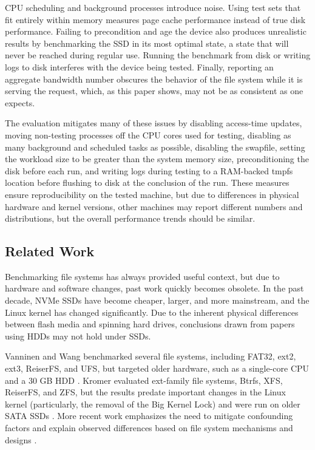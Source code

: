\documentclass[letterpaper,twocolumn,10pt]{article}
\begin{document}
CPU scheduling and background processes introduce noise. Using test sets that fit entirely within memory measures page cache performance instead of true disk performance. Failing to precondition and age the device also produces unrealistic results by benchmarking the SSD in its most optimal state, a state that will never be reached during regular use. Running the benchmark from disk or writing logs to disk interferes with the device being tested. Finally, reporting an aggregate bandwidth number obscures the behavior of the file system while it is serving the request, which, as this paper shows, may not be as consistent as one expects.

The evaluation mitigates many of these issues by disabling access-time updates, moving non-testing processes off the CPU cores used for testing, disabling as many background and scheduled tasks as possible, disabling the swapfile, setting the workload size to be greater than the system memory size, preconditioning the disk before each run, and writing logs during testing to a RAM-backed tmpfs location before flushing to disk at the conclusion of the run. These measures ensure reproducibility on the tested machine, but due to differences in physical hardware and kernel versions, other machines may report different numbers and distributions, but the overall performance trends should be similar.

\subsection{Related Work}
Benchmarking file systems has always provided useful context, but due to hardware and software changes, past work quickly becomes obsolete. In the past decade, NVMe SSDs have become cheaper, larger, and more mainstream, and the Linux kernel has changed significantly. Due to the inherent physical differences between flash media and spinning hard drives, conclusions drawn from papers using HDDs may not hold under SSDs.

Vanninen and Wang benchmarked several file systems, including FAT32, ext2, ext3, ReiserFS, and UFS, but targeted older hardware, such as a single-core CPU and a 30 GB HDD \cite{2003-paper}. Kromer evaluated ext-family file systems, Btrfs, XFS, ReiserFS, and ZFS, but the results predate important changes in the Linux kernel (particularly, the removal of the Big Kernel Lock) and were run on older SATA SSDs \cite{2012-article}. More recent work emphasizes the need to mitigate confounding factors and explain observed differences based on file system mechanisms and designs \cite{bffs,pbfs}.
\end{document}

